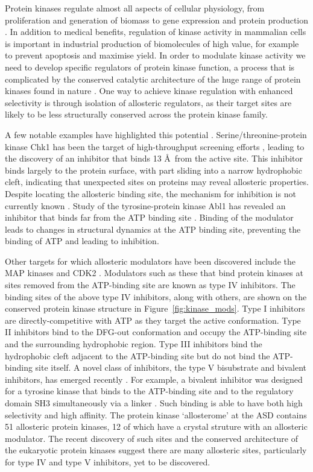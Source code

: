 Protein kinases regulate almost all aspects of cellular physiology, from proliferation and generation of biomass to gene expression and protein production \cite{Manning2002}.
In addition to medical benefits, regulation of kinase activity in mammalian cells is important in industrial production of biomolecules of high value, for example to prevent apoptosis and maximise yield.
In order to modulate kinase activity we need to develop specific regulators of protein kinase function, a process that is complicated by the conserved catalytic architecture of the huge range of protein kinases found in nature \cite{Muller2015}.
One way to achieve kinase regulation with enhanced selectivity is through isolation of allosteric regulators, as their target sites are likely to be less structurally conserved across the protein kinase family.

A few notable examples have highlighted this potential \cite{Gavrin2013}.
Serine/threonine-protein kinase Chk1 has been the target of high-throughput screening efforts \cite{Converso2009}, leading to the discovery of an inhibitor that binds 13 \AA\ from the active site.
This inhibitor binds largely to the protein surface, with part sliding into a narrow hydrophobic cleft, indicating that unexpected sites on proteins may reveal allosteric properties.
Despite locating the allosteric binding site, the mechanism for inhibition is not currently known \cite{Vanderpool2009}.
Study of the tyrosine-protein kinase Abl1 has revealed an inhibitor that binds far from the ATP binding site \cite{Zhang2010, Yang2011}.
Binding of the modulator leads to changes in structural dynamics at the ATP binding site, preventing the binding of ATP and leading to inhibition.

Other targets for which allosteric modulators have been discovered include the MAP kinases \cite{Comess2011} and CDK2 \cite{Betzi2011}.
Modulators such as these that bind protein kinases at sites removed from the ATP-binding site are known as type IV inhibitors.
The binding sites of the above type IV inhibitors, along with others, are shown on the conserved protein kinase structure in Figure~\ref{fig:kinase_mods}.
Type I inhibitors are directly-competitive with ATP as they target the active conformation.
Type II inhibitors bind to the DFG-out conformation and occupy the ATP-binding site and the surrounding hydrophobic region.
Type III inhibitors bind the hydrophobic cleft adjacent to the ATP-binding site but do not bind the ATP-binding site itself.
A novel class of inhibitors, the type V bisubstrate and bivalent inhibitors, has emerged recently \cite{Lamba2012}.
For example, a bivalent inhibitor was designed for a tyrosine kinase that binds to the ATP-binding site and to the regulatory domain SH3 simultaneously via a linker \cite{Hill2009}.
Such binding is able to have both high selectivity and high affinity.
The protein kinase `allosterome' at the ASD contains 51 allosteric protein kinases, 12 of which have a crystal struture with an allosteric modulator.
The recent discovery of such sites and the conserved architecture of the eukaryotic protein kinases suggest there are many allosteric sites, particularly for type IV and type V inhibitors, yet to be discovered.


